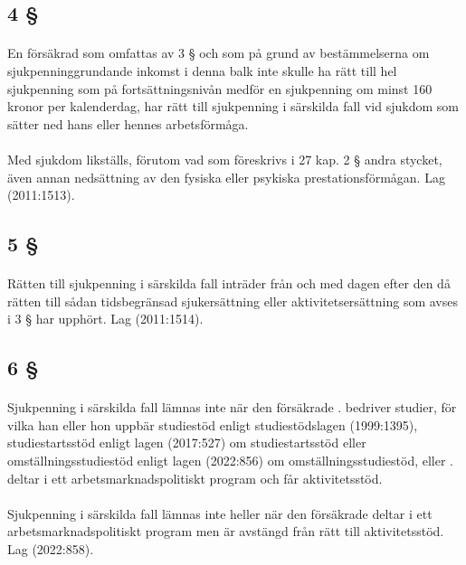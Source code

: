 \documentclass[a4paper,notitlepage,openany,10pt]{book}
\begin{document}
\subsection*{4 §}
\paragraph*{}
En försäkrad som omfattas av 3 § och som på grund av bestämmelserna om sjukpenninggrundande inkomst i denna balk inte skulle ha rätt till hel sjukpenning som på fortsättningsnivån medför en sjukpenning om minst 160 kronor per kalenderdag, har rätt till sjukpenning i särskilda fall vid sjukdom som sätter ned hans eller hennes arbetsförmåga.
\paragraph*{}
Med sjukdom likställs, förutom vad som föreskrivs i 27 kap. 2 § andra stycket, även annan nedsättning av den fysiska eller psykiska prestationsförmågan.
Lag (2011:1513).
\subsection*{5 §}
\paragraph*{}
Rätten till sjukpenning i särskilda fall inträder från och med dagen efter den då rätten till sådan tidsbegränsad sjukersättning eller aktivitetsersättning som avses i 3 § har upphört.
Lag (2011:1514).
\subsection*{6 §}
\paragraph*{}
Sjukpenning i särskilda fall lämnas inte när den försäkrade
. bedriver studier, för vilka han eller hon uppbär studiestöd enligt studiestödslagen (1999:1395), studiestartsstöd enligt lagen (2017:527) om studiestartsstöd eller omställningsstudiestöd enligt lagen (2022:856) om omställningsstudiestöd, eller
. deltar i ett arbetsmarknadspolitiskt program och får aktivitetsstöd.
\paragraph*{}
Sjukpenning i särskilda fall lämnas inte heller när den försäkrade deltar i ett arbetsmarknadspolitiskt program men är avstängd från rätt till aktivitetsstöd.
Lag (2022:858).
\end{document}
